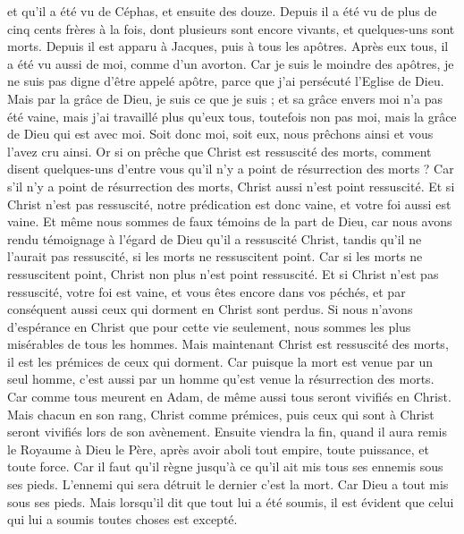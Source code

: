 \begin{multicols}{2}
et qu'il a été vu de Céphas, et ensuite des douze.
Depuis il a été vu de plus de cinq cents frères à la fois, dont plusieurs sont encore vivants, et quelques-uns sont morts.
Depuis il est apparu à Jacques, puis à tous les apôtres.
Après eux tous, il a été vu aussi de moi, comme d'un avorton.
Car je suis le moindre des apôtres, je ne suis pas digne d'être appelé apôtre, parce que j'ai persécuté l'Eglise de Dieu.
Mais par la grâce de Dieu, je suis ce que je suis ; et sa grâce envers moi n'a pas été vaine, mais j'ai travaillé plus qu'eux tous, toutefois non pas moi, mais la grâce de Dieu qui est avec moi.
Soit donc moi, soit eux, nous prêchons ainsi et vous l'avez cru ainsi.
Or si on prêche que Christ est ressuscité des morts, comment disent quelques-uns d'entre vous qu'il n'y a point de résurrection des morts ?
Car s'il n'y a point de résurrection des morts, Christ aussi n'est point ressuscité.
Et si Christ n'est pas ressuscité, notre prédication est donc vaine, et votre foi aussi est vaine.
Et même nous sommes de faux témoins de la part de Dieu, car nous avons rendu témoignage à l'égard de Dieu qu'il a ressuscité Christ, tandis qu'il ne l'aurait pas ressuscité, si les morts ne ressuscitent point.
Car si les morts ne ressuscitent point, Christ non plus n'est point ressuscité.
Et si Christ n'est pas ressuscité, votre foi est vaine, et vous êtes encore dans vos péchés,
et par conséquent aussi ceux qui dorment en Christ sont perdus.
Si nous n'avons d'espérance en Christ que pour cette vie seulement, nous sommes les plus misérables de tous les hommes.
Mais maintenant Christ est ressuscité des morts, il est les prémices de ceux qui dorment.
Car puisque la mort est venue par un seul homme, c'est aussi par un homme qu'est venue la résurrection des morts.
Car comme tous meurent en Adam, de même aussi tous seront vivifiés en Christ.
Mais chacun en son rang, Christ comme prémices, puis ceux qui sont à Christ seront vivifiés lors de son avènement.
Ensuite viendra la fin, quand il aura remis le Royaume à Dieu le Père, après avoir aboli tout empire, toute puissance, et toute force.
Car il faut qu'il règne jusqu'à ce qu'il ait mis tous ses ennemis sous ses pieds.
L'ennemi qui sera détruit le dernier c'est la mort.
Car Dieu a tout mis sous ses pieds. Mais lorsqu'il dit que tout lui a été soumis, il est évident que celui qui lui a soumis toutes choses est excepté.

\end{multicols}
